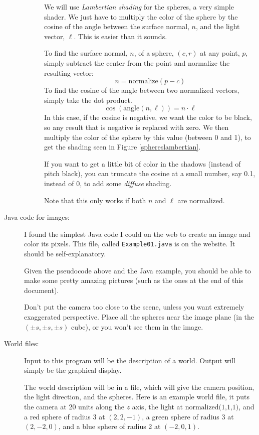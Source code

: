 \documentclass{article}
\begin{document}
\begin{description}
\begin{description}
We will use {\em Lambertian shading}
for the spheres, a very simple shader.
We just have to multiply the
color of the sphere by the cosine of the angle between the surface
normal, $n$, and the light vector, $\ell$.  This is easier than it sounds.

To find the surface normal, $n$, of a sphere, $(c,r)$ at any point, $p$,
simply subtract the center from the point and normalize the
resulting vector:
\[
n = \mbox{normalize}(p-c)
\]
To find the cosine of the angle between two normalized vectors, simply
take the dot product.
\[
\cos(\mbox{angle}(n,\ell)) = n \cdot \ell
\]
In this case, if the cosine is negative, we want the color to be
black, so any result that is negative is replaced with zero.
We then multiply the color of the sphere by this value (between 0 and
1), to get the shading seen in Figure \ref{sphereslambertian}.

If you want to get a little bit of color in the shadows (instead of
pitch black), you can truncate the cosine at a small number, say 0.1,
instead of 0, to add some {\em diffuse} shading.

Note that this only works if both $n$ and $\ell$ are normalized.

  \end{description}
  

\item[Java code for images:]
  I found the simplest Java code I could on the web to create an image
  and color its pixels.  This file, called {\tt Example01.java} is on
  the website.  It should be self-explanatory.

  Given the pseudocode above and the Java example, you should be able
  to make some pretty amazing pictures (such as the ones at the end of
  this document).

  Don't put the camera too close to the scene, unless you want
  extremely exaggerated perspective.  Place all the spheres near the
  image plane (in the $(\pm s, \pm s, \pm s)$ cube), or you won't see
  them in the image.

\item[World files:]  Input to this program will be the description of
  a world.  Output will simply be the graphical display.

  The world description will be in a file, which will give the camera
  position, the light direction, and the spheres.  Here is an example
  world file, it puts the camera at 20 units along the $z$ axis, the
  light at $\mbox{normalized(1,1,1)}$, and a red sphere of radius 3 at
  $(2,2,-1)$, a green sphere of radius 3 at $(2,-2,0)$, and a blue
  sphere of radius 2 at $(-2,0,1)$.


\end{description}
\end{document}
